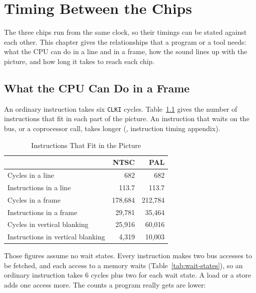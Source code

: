\chapter{Timing Between the Chips}
\label{ch:synchronisation}

The three chips run from the same clock, so their timings can be stated against each other. This chapter gives the
relationships that a program or a tool needs: what the CPU can do in a line and in a frame, how the sound lines up with
the picture, and how long it takes to reach each chip.

\section{What the CPU Can Do in a Frame}
\label{sec:cpu-budget}

An ordinary instruction takes six \texttt{CLKI} cycles. Table~\ref{tab:cpu-budget} gives the number of instructions
that fit in each part of the picture. An instruction that waits on the bus, or a coprocessor call, takes longer
(\archmanual{}, instruction timing appendix).

\begin{table}[H]
	\centering
	\begin{tabular}{lrr}
		\toprule
		                                  & \textbf{NTSC} & \textbf{PAL} \\
		\midrule
		Cycles in a line                  & 682           & 682          \\
		Instructions in a line            & 113.7         & 113.7        \\
		Cycles in a frame                 & 178,684       & 212,784      \\
		Instructions in a frame           & 29,781        & 35,464       \\
		Cycles in vertical blanking       & 25,916        & 60,016       \\
		Instructions in vertical blanking & 4,319         & 10,003       \\
		\bottomrule
	\end{tabular}
	\caption{Instructions That Fit in the Picture}
	\label{tab:cpu-budget}
\end{table}

\noindent Those figures assume no wait states. Every instruction makes two bus accesses to be fetched, and each access to a
memory waits (Table~\ref{tab:wait-states}), so an ordinary instruction takes 6 cycles plus two for each wait state. A load or
a store adds one access more. The counts a program really gets are lower:


